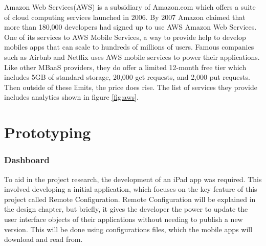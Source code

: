 Amazon Web Services(AWS) \cite{aws} is a subsidiary of Amazon.com which offers a suite of cloud computing services launched in 2006. By 2007 Amazon claimed that more than 180,000 developers had signed up to use AWS Amazon Web Services. One of its services to AWS Mobile Services, a way to provide help to develop mobiles apps that can scale to hundreds of millions of users. Famous companies such as Airbnb and Netflix uses AWS mobile services to power their applications. Like other MBaaS providers, they do offer a limited 12-month free tier which includes 5GB of standard storage, 20,000 get requests, and 2,000 put requests. Then outside of these limits, the price does rise. The list of services they provide includes analytics shown in figure \ref{fig:aws}.





\section{Prototyping}

\subsubsection{Dashboard}

To aid in the project research, the development of an iPad app was required. This involved developing a initial application, which focuses on the key feature of this project called Remote Configuration. Remote Configuration will be explained in the design chapter, but briefly, it gives the developer the power to update the user interface objects of their applications without needing to publish a new version. This will be done using configurations files, which the mobile apps will download and read from.

